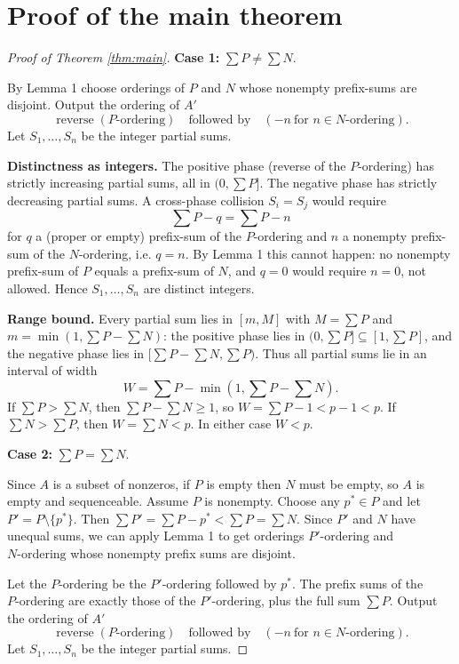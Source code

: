 \documentclass[11pt]{article}
\theoremstyle{definition}
\begin{document}
\section{Proof of the main theorem}

\begin{proof}[Proof of Theorem \ref{thm:main}]
\textbf{Case 1:} $\sum P \ne \sum N$.

By Lemma 1 choose orderings of $P$ and $N$ whose nonempty prefix-sums are
disjoint. Output the ordering of $A'$
\[
  \operatorname{reverse}(P\text{-ordering})\quad\text{followed by}\quad
  (-n\ \text{for }n\in N\text{-ordering}).
\]
Let $S_1,\dots,S_n$ be the integer partial sums.

\textbf{Distinctness as integers.} The positive phase (reverse of the
$P$-ordering) has strictly increasing partial sums, all in $(0,\sum P]$.
The negative phase has strictly decreasing partial sums. A cross-phase
collision $S_i=S_j$ would require
\[
  \sum P-q=\sum P-n
\]
for $q$ a (proper or empty) prefix-sum of the $P$-ordering and $n$ a
nonempty prefix-sum of the $N$-ordering, i.e. $q=n$. By Lemma 1 this cannot
happen: no nonempty prefix-sum of $P$ equals a prefix-sum of $N$, and $q=0$
would require $n=0$, not allowed. Hence $S_1,\dots,S_n$ are distinct
integers.

\textbf{Range bound.} Every partial sum lies in $[m,M]$ with
$M=\sum P$ and $m=\min(1,\sum P-\sum N)$: the positive phase lies in
$(0,\sum P]\subseteq[1,\sum P]$, and the negative phase lies in
$[\sum P-\sum N,\sum P)$. Thus all partial sums lie in an interval of width
\[
  W=\sum P-\min(1,\sum P-\sum N).
\]
If $\sum P>\sum N$, then $\sum P-\sum N\ge1$, so $W=\sum P-1<p-1<p$.
If $\sum N>\sum P$, then $W=\sum N<p$. In either case $W<p$.

\textbf{Case 2:} $\sum P = \sum N$.

Since $A$ is a subset of nonzeros, if $P$ is empty then $N$ must be empty,
so $A$ is empty and sequenceable. Assume $P$ is nonempty. Choose any
$p^* \in P$ and let $P' = P \setminus \{p^*\}$. Then
$\sum P' = \sum P - p^* < \sum P = \sum N$. Since $P'$ and $N$ have unequal
sums, we can apply Lemma 1 to get orderings $P'\text{-ordering}$ and
$N\text{-ordering}$ whose nonempty prefix sums are disjoint.

Let the $P\text{-ordering}$ be the $P'\text{-ordering}$ followed by $p^*$.
The prefix sums of the $P\text{-ordering}$ are exactly those of the
$P'\text{-ordering}$, plus the full sum $\sum P$. Output the ordering
of $A'$
\[
  \operatorname{reverse}(P\text{-ordering})\quad\text{followed by}\quad
  (-n\ \text{for }n\in N\text{-ordering}).
\]
Let $S_1,\dots,S_n$ be the integer partial sums.


\end{proof}
\end{document}
